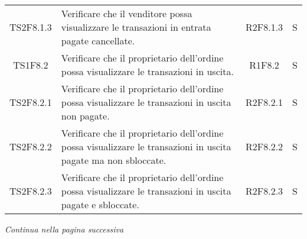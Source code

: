 \begin{table}[H]
\begin{tabular}{c|p{8cm}|c|c}
    TS2F8.1.3 & Verificare che il venditore possa visualizzare le transazioni in entrata pagate cancellate.                              & R2F8.1.3 & S \\
    TS1F8.2   & Verificare che il proprietario dell'ordine possa visualizzare le transazioni in uscita.                                  & R1F8.2   & S \\
    TS2F8.2.1 & Verificare che il proprietario dell'ordine possa visualizzare le transazioni in uscita non pagate.                       & R2F8.2.1 & S \\
    TS2F8.2.2 & Verificare che il proprietario dell'ordine possa visualizzare le transazioni in uscita pagate ma non sbloccate.          & R2F8.2.2 & S \\
    TS2F8.2.3 & Verificare che il proprietario dell'ordine possa visualizzare le transazioni in uscita pagate e sbloccate.               & R2F8.2.3 & S \\
  \end{tabular}
\end{table}
\begin{center}
  \textit{\small Continua nella pagina successiva}
\end{center}
